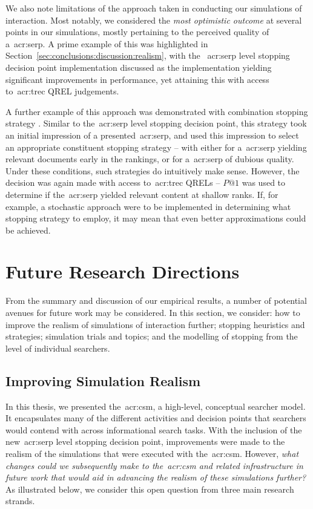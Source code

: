We also note limitations of the approach taken in conducting our simulations of interaction. Most notably, we considered the \emph{most optimistic outcome} at several points in our simulations, mostly pertaining to the perceived quality of a~\gls{acr:serp}. A prime example of this was highlighted in Section~\ref{sec:conclusions:discussion:realism}, with the ~\gls{acr:serp} level stopping decision point implementation discussed as the implementation yielding significant improvements in performance, yet attaining this with access to~\gls{acr:trec} QREL judgements.

A further example of this approach was demonstrated with combination stopping strategy . Similar to the~\gls{acr:serp} level stopping decision point, this strategy took an initial impression of a presented~\gls{acr:serp}, and used this impression to select an appropriate constituent stopping strategy -- with either  for a~\gls{acr:serp} yielding relevant documents early in the rankings, or  for a~\gls{acr:serp} of dubious quality. Under these conditions, such strategies do intuitively make sense. However, the decision was again made with access to~\gls{acr:trec} QRELs -- $P@1$ was used to determine if the~\gls{acr:serp} yielded relevant content at shallow ranks. If, for example, a stochastic approach were to be implemented in determining what stopping strategy to employ, it may mean that even better approximations could be achieved.

\section{Future Research Directions}\label{sec:conclusions:future}
From the summary and discussion of our empirical results, a number of potential avenues for future work may be considered. In this section, we consider: how to improve the realism of simulations of interaction further; stopping heuristics and strategies; simulation trials and topics; and the modelling of stopping from the level of individual searchers.

\subsection{Improving Simulation Realism}\label{sec:conclusions:future:improving}
In this thesis, we presented the~\gls{acr:csm}, a high-level, conceptual searcher model. It encapsulates many of the different activities and decision points that searchers would contend with across informational search tasks. With the inclusion of the new~\gls{acr:serp} level stopping decision point, improvements were made to the realism of the simulations that were executed with the~\gls{acr:csm}. However, \emph{what changes could we subsequently make to the~\gls{acr:csm} and related infrastructure in future work that would aid in advancing the realism of these simulations further?} As illustrated below, we consider this open question from three main research strands.

